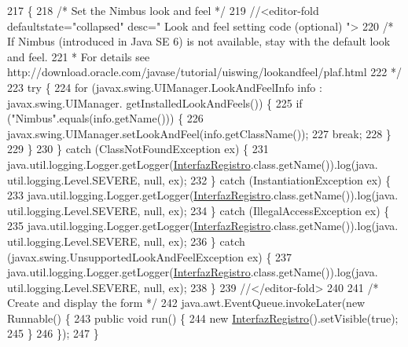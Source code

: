 \begin{DoxyCode}
217                                            \{
218         \textcolor{comment}{/* Set the Nimbus look and feel */}
219         \textcolor{comment}{//<editor-fold defaultstate="collapsed" desc=" Look and feel setting code (optional) ">}
220         \textcolor{comment}{/* If Nimbus (introduced in Java SE 6) is not available, stay with the default look and feel.}
221 \textcolor{comment}{         * For details see http://download.oracle.com/javase/tutorial/uiswing/lookandfeel/plaf.html }
222 \textcolor{comment}{         */}
223         \textcolor{keywordflow}{try} \{
224             \textcolor{keywordflow}{for} (javax.swing.UIManager.LookAndFeelInfo info : javax.swing.UIManager.
      getInstalledLookAndFeels()) \{
225                 \textcolor{keywordflow}{if} (\textcolor{stringliteral}{"Nimbus"}.equals(info.getName())) \{
226                     javax.swing.UIManager.setLookAndFeel(info.getClassName());
227                     \textcolor{keywordflow}{break};
228                 \}
229             \}
230         \} \textcolor{keywordflow}{catch} (ClassNotFoundException ex) \{
231             java.util.logging.Logger.getLogger(\mbox{\hyperlink{class_interfaz_package_1_1_interfaz_registro_af44bbc6e1ad688d95cff640e7ce5a387}{InterfazRegistro}}.class.getName()).log(java.
      util.logging.Level.SEVERE, null, ex);
232         \} \textcolor{keywordflow}{catch} (InstantiationException ex) \{
233             java.util.logging.Logger.getLogger(\mbox{\hyperlink{class_interfaz_package_1_1_interfaz_registro_af44bbc6e1ad688d95cff640e7ce5a387}{InterfazRegistro}}.class.getName()).log(java.
      util.logging.Level.SEVERE, null, ex);
234         \} \textcolor{keywordflow}{catch} (IllegalAccessException ex) \{
235             java.util.logging.Logger.getLogger(\mbox{\hyperlink{class_interfaz_package_1_1_interfaz_registro_af44bbc6e1ad688d95cff640e7ce5a387}{InterfazRegistro}}.class.getName()).log(java.
      util.logging.Level.SEVERE, null, ex);
236         \} \textcolor{keywordflow}{catch} (javax.swing.UnsupportedLookAndFeelException ex) \{
237             java.util.logging.Logger.getLogger(\mbox{\hyperlink{class_interfaz_package_1_1_interfaz_registro_af44bbc6e1ad688d95cff640e7ce5a387}{InterfazRegistro}}.class.getName()).log(java.
      util.logging.Level.SEVERE, null, ex);
238         \}
239         \textcolor{comment}{//</editor-fold>}
240 
241         \textcolor{comment}{/* Create and display the form */}
242         java.awt.EventQueue.invokeLater(\textcolor{keyword}{new} Runnable() \{
243             \textcolor{keyword}{public} \textcolor{keywordtype}{void} run() \{
244                 \textcolor{keyword}{new} \mbox{\hyperlink{class_interfaz_package_1_1_interfaz_registro_af44bbc6e1ad688d95cff640e7ce5a387}{InterfazRegistro}}().setVisible(\textcolor{keyword}{true});
245             \}
246         \});
247     \}
\end{DoxyCode}


